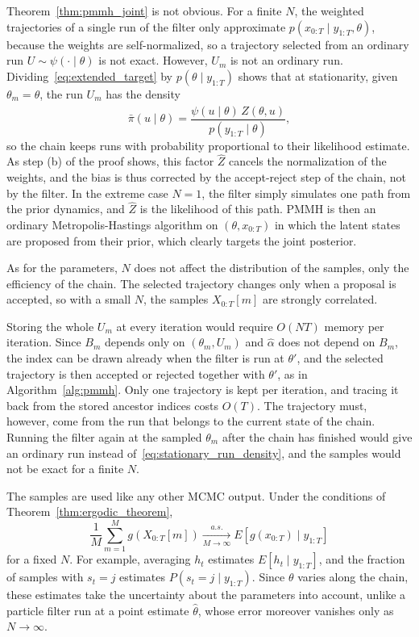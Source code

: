 Theorem~\ref{thm:pmmh_joint} is not obvious. For a finite $N$, the weighted trajectories of a single run of the filter only approximate $p(x_{0:T}\mid y_{1:T},\theta)$, because the weights are self-normalized, so a trajectory selected from an ordinary run $U\sim\psi(\cdot\mid\theta)$ is not exact. However, $U_m$ is not an ordinary run. Dividing~\eqref{eq:extended_target} by $p(\theta\mid y_{1:T})$ shows that at stationarity, given $\theta_m=\theta$, the run $U_m$ has the density
\begin{equation}
    \bar{\pi}(u\mid\theta) = \frac{\psi(u\mid\theta)\,\hat{Z}(\theta,u)}{p(y_{1:T}\mid\theta)},
    \label{eq:stationary_run_density}
\end{equation}
so the chain keeps runs with probability proportional to their likelihood estimate. As step (b) of the proof shows, this factor $\hat{Z}$ cancels the normalization of the weights, and the bias is thus corrected by the accept-reject step of the chain, not by the filter. In the extreme case $N=1$, the filter simply simulates one path from the prior dynamics, and $\hat{Z}$ is the likelihood of this path. PMMH is then an ordinary Metropolis-Hastings algorithm on $(\theta,x_{0:T})$ in which the latent states are proposed from their prior, which clearly targets the joint posterior.

As for the parameters, $N$ does not affect the distribution of the samples, only the efficiency of the chain. The selected trajectory changes only when a proposal is accepted, so with a small $N$, the samples $X_{0:T}[m]$ are strongly correlated.

Storing the whole $U_m$ at every iteration would require $O(NT)$ memory per iteration. Since $B_m$ depends only on $(\theta_m,U_m)$ and $\hat{\alpha}$ does not depend on $B_m$, the index can be drawn already when the filter is run at $\theta'$, and the selected trajectory is then accepted or rejected together with $\theta'$, as in Algorithm~\ref{alg:pmmh}. Only one trajectory is kept per iteration, and tracing it back from the stored ancestor indices costs $O(T)$. The trajectory must, however, come from the run that belongs to the current state of the chain. Running the filter again at the sampled $\theta_m$ after the chain has finished would give an ordinary run instead of~\eqref{eq:stationary_run_density}, and the samples would not be exact for a finite $N$.

The samples are used like any other MCMC output. Under the conditions of Theorem~\ref{thm:ergodic_theorem},
\begin{equation}
    \frac{1}{M}\sum_{m=1}^{M} g\left(X_{0:T}[m]\right) \xrightarrow[M\to\infty]{a.s.} E\left[g(x_{0:T})\mid y_{1:T}\right]
    \label{eq:pmmh_state_estimator}
\end{equation}
for a fixed $N$. For example, averaging $h_t$ estimates $E[h_t\mid y_{1:T}]$, and the fraction of samples with $s_t=j$ estimates $P(s_t=j\mid y_{1:T})$. Since $\theta$ varies along the chain, these estimates take the uncertainty about the parameters into account, unlike a particle filter run at a point estimate $\hat{\theta}$, whose error moreover vanishes only as $N\to\infty$.


